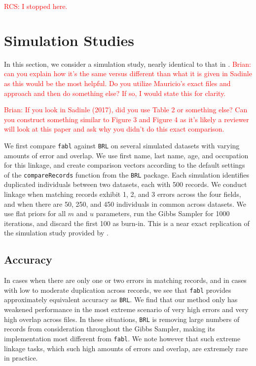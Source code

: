 \documentclass[12pt,letterpaper]{article}
\newcommand{\1}[1]{\mathbb{I}\!\left[#1\right]} %
\begin{document}
\textcolor{red}{RCS: I stopped here.}

\section{Simulation Studies}
\label{sec:simulations}
In this section, we consider a simulation study, nearly identical to that in \cite{sadinle2017}. \textcolor{red}{Brian: can you explain how it's the same versus different than what it is given in Sadinle as this would be the most helpful. Do you utilize Mauricio's exact files and approach and then do something else? If so, I would state this for clarity.} 

\textcolor{red}{Brian: If you look in Sadinle (2017), did you use Table 2 or something else? Can you construct something similar to Figure 3 and Figure 4 as it's likely a reviewer will look at this paper and ask why you didn't do this exact comparison.}

We first compare \texttt{fabl} against \texttt{BRL} on several simulated datasets with varying amounts of error and overlap. We use first name, last name, age, and occupation for this linkage, and create comparison vectors according to the default settings of the \texttt{compareRecords} function from the \texttt{BRL} package. Each simulation identifies duplicated individuals between two datasets, each with 500 records. We conduct linkage when matching records exhibit 1, 2, and 3 errors across the four fields, and when there are 50, 250, and 450 individuals in common across datasets. We use flat priors for all $m$ and $u$ parameters, run the Gibbs Sampler for 1000 iterations, and discard the first 100 as burn-in. This is a near exact replication of the simulation study provided by \citep{sadinle2017}. 



\hypertarget{accuracy}{%
	\subsection{Accuracy}\label{accuracy}}


In cases when there are only one or two errors in matching records, and in cases with low to moderate duplication across records, we see that \texttt{fabl} provides approximately equivalent accuracy as \texttt{BRL}. 
We find that our method only has weakened performance in the
most extreme scenario of very high errors and very high overlap across
files. In these situations, \texttt{BRL} is removing large numbers of records from consideration throughout the Gibbs Sampler, making its implementation most different from \texttt{fabl}. We note however that such extreme linkage tasks, which such high amounts of errors and overlap, are extremely rare in practice. 
\end{document}
